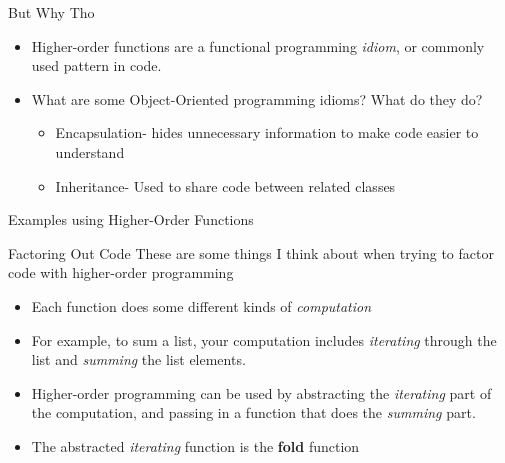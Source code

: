 \documentclass{beamer}
\begin{document}
    \begin{frame}[fragile]{But Why Tho}
    \begin{itemize}
      \item Higher-order functions are a functional programming \textit{idiom}, or commonly used pattern in code. \pause
      \item What are some Object-Oriented programming idioms? What do they do?
      \begin{itemize} \pause
          \item Encapsulation- hides unnecessary information to make code easier to understand
          \item Inheritance- Used to share code between related classes
      \end{itemize}
    \end{itemize}
    \end{frame}
    
    \begin{frame}{Examples using Higher-Order Functions}
        
    \end{frame}
    
    \begin{frame}{Factoring Out Code}
    These are some things I think about when trying to factor code with higher-order programming
    \begin{itemize}
        \item Each function does some different kinds of \textit{computation}
        \item For example, to sum a list, your computation includes \textit{iterating} through the list and \textit{summing} the list elements.
        \item Higher-order programming can be used by abstracting the \textit{iterating} part of the computation, and passing in a function that does the \textit{summing} part.
        \item The abstracted \textit{iterating} function is the \textbf{fold} function
    \end{itemize}
        
    \end{frame}
    
\end{document}
